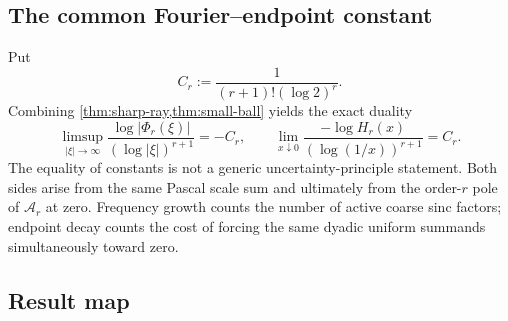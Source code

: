 \documentclass[11pt,a4paper]{article}
\theoremstyle{frontier}
\theoremstyle{definition}
\begin{document}
\subsection{The common Fourier--endpoint constant}

Put
\begin{equation}\label{eq:Cr-common}
 C_r:=\frac1{(r+1)!(\log2)^r}.
\end{equation}
Combining \cref{thm:sharp-ray,thm:small-ball} yields the exact duality
\begin{equation}\label{eq:fourier-endpoint-duality}
 \limsup_{|\xi|\to\infty}
 \frac{\log|\Phi_r(\xi)|}{(\log|\xi|)^{r+1}}
 =-C_r,
 \qquad
 \lim_{x\downarrow0}
 \frac{-\log H_r(x)}{(\log(1/x))^{r+1}}
 =C_r.
\end{equation}
The equality of constants is not a generic uncertainty-principle statement.  Both sides arise from the same Pascal scale sum and ultimately from the order-$r$ pole of $\mathcal A_r$ at zero.  Frequency growth counts the number of active coarse sinc factors; endpoint decay counts the cost of forcing the same dyadic uniform summands simultaneously toward zero.

\subsection{Result map}
\end{document}
